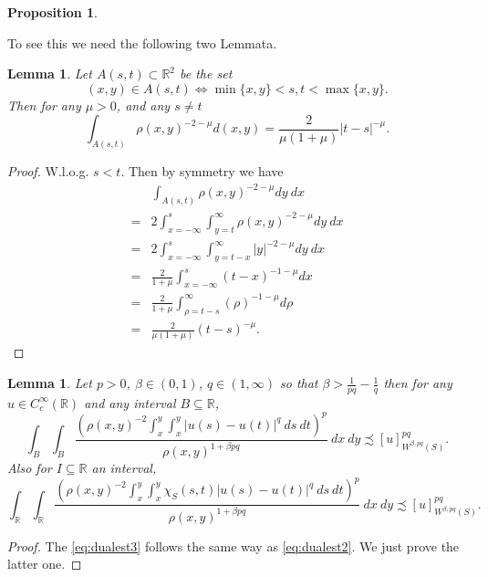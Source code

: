 \documentclass[a4paper,10pt,intlimits,ngerman]{amsart}
\newcommand{\iv}{B} %
\newtheorem{proposition}[theorem]{Proposition}
\newtheorem{lemma}[theorem]{Lemma}
\numberwithin{equation}{section}
\newcommand{\R}{\mathbb{R}}
\newcommand{\aleq}{\precsim}
\newcommand{\brac}[1]{\left ( #1 \right )}
\begin{document}
\begin{appendix}
\begin{proposition}
\end{proposition}
To see this we need the following two Lemmata.

\begin{lemma}\label{la:Ast}
Let $A(s,t) \subset \R^2$ be the set
\begin{equation}\label{eq:Ast}
 (x,y) \in A(s,t) \Leftrightarrow \min \{x,y\} < s,t < \max \{x,y\}.
\end{equation}
Then for any $\mu > 0$, and any $s \neq t$
\begin{equation}\label{eq:intast}
 \int_{A(s,t)} \rho(x,y)^{-2-\mu} d(x,y)= \frac{2}{\mu(1+\mu)} |t-s|^{-\mu}.
\end{equation}
\end{lemma}
\begin{proof}
W.l.o.g. $s < t$. Then by symmetry we have
\[
\begin{split}
 &\int_{A(s,t)} \rho(x,y)^{-2-\mu} dy\ dx\\
 =& 2\int_{x=-\infty}^{s} \int_{y=t}^\infty \rho(x,y)^{-2-\mu} dy\ dx\\
 =& 2\int_{x=-\infty}^{s} \int_{y=t-x}^\infty |y|^{-2-\mu} dy\ dx\\
 =& \frac{2}{1+\mu}\int_{x=-\infty}^{s} (t-x)^{-1-\mu} dx\\
 =& \frac{2}{1+\mu}\int_{\rho=t-s}^{\infty} (\rho)^{-1-\mu} d\rho\\
 =& \frac{2}{\mu(1+\mu)} (t-s)^{-\mu}.
\end{split}
 \]
\end{proof}

\begin{lemma}\label{la:meanvalueintest}
Let $p >0$, $\beta \in (0,1)$, $q \in (1,\infty)$ so that  $\beta > \frac{1}{pq}-\frac{1}{q}$ then for any $u \in C_c^\infty(\R)$ and any interval $\iv \subseteq \R$,
\begin{equation}\label{eq:dualest2}
 \int_{\iv} \int_{\iv} \frac{\brac{\rho(x,y)^{-2} \int_x^y\int_x^y |u(s)-u(t)|^{q}\ ds\ dt}^{p}}{\rho(x,y)^{1+\beta p q}}\ dx\ dy \aleq [u]_{W^{\beta,pq}(S)}^{pq}.
\end{equation}
Also for $I \subseteq \R$ an interval,
\begin{equation}\label{eq:dualest3}
 \int_{\R} \int_{\R} \frac{\brac{\rho(x,y)^{-2} \int_x^y\int_x^y \chi_S(s,t)|u(s)-u(t)|^{q}\ ds\ dt}^{p}}{\rho(x,y)^{1+\beta p q}}\ dx\ dy \aleq [u]_{W^{\beta,pq}(S)}^{pq}.
\end{equation}

\end{lemma}
\begin{proof}
The \eqref{eq:dualest3} follows the same way as \eqref{eq:dualest2}. We just prove the latter one.


\end{proof}
\end{appendix}
\end{document}
